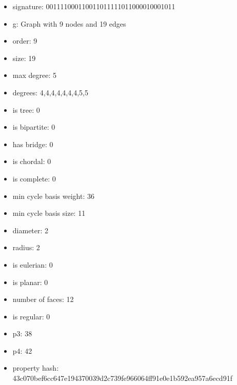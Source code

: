\newpage
\begin{figure}
\end{figure}
\begin{itemize}
\item signature: 001111000110011011111011000010001011
\item g: Graph with 9 nodes and 19 edges
\item order: 9
\item size: 19
\item max degree: 5
\item degrees: 4,4,4,4,4,4,4,5,5
\item is tree: 0
\item is bipartite: 0
\item has bridge: 0
\item is chordal: 0
\item is complete: 0
\item min cycle basis weight: 36
\item min cycle basis size: 11
\item diameter: 2
\item radius: 2
\item is eulerian: 0
\item is planar: 0
\item number of faces: 12
\item is regular: 0
\item p3: 38
\item p4: 42
\item property hash: 43c070bef6cc647e194370039d2c739fe966064ff91e0e1b592ea957a6ecd91f
\end{itemize}
